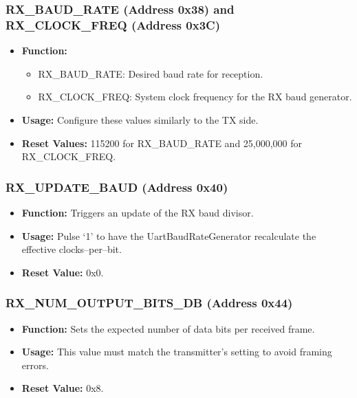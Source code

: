 \subsubsection{RX\_BAUD\_RATE (Address 0x38) and RX\_CLOCK\_FREQ (Address 0x3C)}
\begin{itemize}[noitemsep]
    \item \textbf{Function:} 
    \begin{itemize}
        \item RX\_BAUD\_RATE: Desired baud rate for reception.
        \item RX\_CLOCK\_FREQ: System clock frequency for the RX baud generator.
    \end{itemize}
    \item \textbf{Usage:} Configure these values similarly to the TX side.
    \item \textbf{Reset Values:} 115200 for RX\_BAUD\_RATE and 25,000,000 for RX\_CLOCK\_FREQ.
\end{itemize}

\subsubsection{RX\_UPDATE\_BAUD (Address 0x40)}
\begin{itemize}[noitemsep]
    \item \textbf{Function:} Triggers an update of the RX baud divisor.
    \item \textbf{Usage:} Pulse ‘1’ to have the UartBaudRateGenerator recalculate the effective clocks–per–bit.
    \item \textbf{Reset Value:} 0x0.
\end{itemize}

\subsubsection{RX\_NUM\_OUTPUT\_BITS\_DB (Address 0x44)}
\begin{itemize}[noitemsep]
    \item \textbf{Function:} Sets the expected number of data bits per received frame.
    \item \textbf{Usage:} This value must match the transmitter’s setting to avoid framing errors.
    \item \textbf{Reset Value:} 0x8.
\end{itemize}

